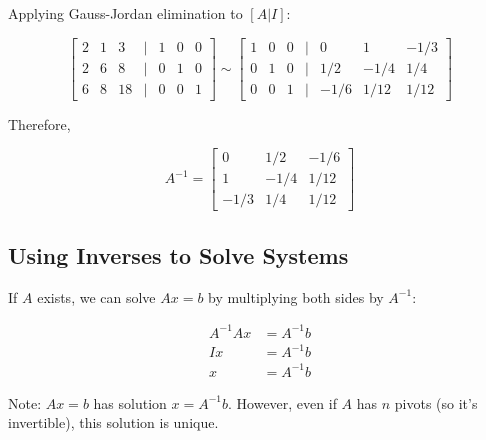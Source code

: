 \documentclass[12pt,a4paper]{article}
\begin{document}
Applying Gauss-Jordan elimination to $[A|I]$:

\[
\begin{bmatrix}
2 & 1 & 3 & | & 1 & 0 & 0 \\
2 & 6 & 8 & | & 0 & 1 & 0 \\
6 & 8 & 18 & | & 0 & 0 & 1
\end{bmatrix} \sim
\begin{bmatrix}
1 & 0 & 0 & | & 0 & 1 & -1/3 \\
0 & 1 & 0 & | & 1/2 & -1/4 & 1/4 \\
0 & 0 & 1 & | & -1/6 & 1/12 & 1/12
\end{bmatrix}
\]

Therefore,

\[
A^{-1} = \begin{bmatrix}
0 & 1/2 & -1/6 \\
1 & -1/4 & 1/12 \\
-1/3 & 1/4 & 1/12
\end{bmatrix}
\]

\subsection{Using Inverses to Solve Systems}

If $A$ exists, we can solve $Ax = b$ by multiplying both sides by $A^{-1}$:

\begin{align*}
A^{-1}Ax &= A^{-1}b \\
Ix &= A^{-1}b \\
x &= A^{-1}b
\end{align*}

Note: $Ax = b$ has solution $x = A^{-1}b$. However, even if $A$ has $n$ pivots (so it's invertible), this solution is unique.
\end{document}
